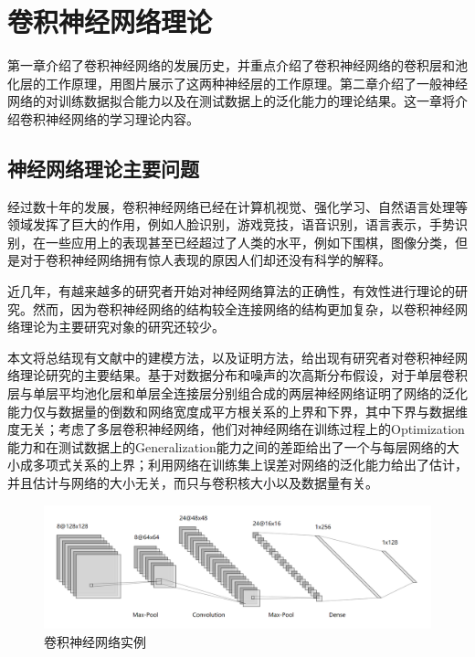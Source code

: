 \chapter{卷积神经网络理论}
\label{cha:theory}

第一章介绍了卷积神经网络的发展历史，并重点介绍了卷积神经网络的卷积层和池化层的工作原理，用图片展示了这两种神经层的工作原理。第二章介绍了一般神经网络的对训练数据拟合能力以及在测试数据上的泛化能力的理论结果。这一章将介绍卷积神经网络的学习理论内容。

\section{神经网络理论主要问题}
经过数十年的发展，卷积神经网络已经在计算机视觉\cite{krizhevsky2012imagenet}、强化学习\cite{silver2016mastering}、自然语言处理\cite{amari2003handbook}等领域发挥了巨大的作用，例如人脸识别\cite{lawrence1997face,parkhi2015deep}，游戏竞技\cite{oh2015action,silver2016mastering}，语音识别\cite{abdel2012applying,deng2013new,abdel2014convolutional}，语言表示\cite{hu2014convolutional,kalchbrenner2014convolutional}，手势识别\cite{molchanov2015hand}，在一些应用上的表现甚至已经超过了人类的水平，例如下围棋\cite{silver2016mastering}，图像分类\cite{he2016deep}，但是对于卷积神经网络拥有惊人表现的原因人们却还没有科学的解释。
\par
近几年，有越来越多的研究者开始对神经网络算法的正确性，有效性进行理论的研究\cite{du2018gradient,allen2019learning,li2018learning,allen2018convergence,brutzkus2017sgd,arora2019fine}。然而，因为卷积神经网络的结构较全连接网络的结构更加复杂，以卷积神经网络理论为主要研究对象的研究还较少。

\par
本文将总结现有文献中的建模方法，以及证明方法，给出现有研究者对卷积神经网络理论研究的主要结果。\citet{du2018many}基于对数据分布和噪声的次高斯分布假设，对于单层卷积层与单层平均池化层和单层全连接层分别组合成的两层神经网络证明了网络的泛化能力仅与数据量的倒数和网络宽度成平方根关系的上界和下界，其中下界与数据维度无关；\citet{zhou2018understanding}考虑了多层卷积神经网络，他们对神经网络在训练过程上的Optimization能力和在测试数据上的Generalization能力之间的差距给出了一个与每层网络的大小成多项式关系的上界；\citet{long2019size}利用网络在训练集上误差对网络的泛化能力给出了估计，并且估计与网络的大小无关，而只与卷积核大小以及数据量有关。
\begin{figure}
\centering
\includegraphics[width=12cm]{./figures/nn.png}
\caption{卷积神经网络实例}
\label{fig:nn}
\end{figure}

